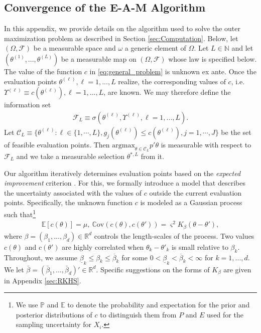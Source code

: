 \documentclass[letterpaper,11pt]{article}
\theoremstyle{myplain}
\theoremstyle{mydefinition}
\theoremstyle{myremark}
\newcommand{\E}{\mathbb{E}}
\newcommand{\F}{\mathcal{F}}
\newcommand{\bP}{\mathbb{P}}
\numberwithin{equation}{section}
\numberwithin{figure}{section}
\begin{document}
\newpage
\small
\begin{appendix}
\small
\section{Convergence of the E-A-M Algorithm}
\label{app:EAM_conv}
In this appendix, we provide details on the algorithm used to solve the outer maximization problem as described in Section \ref{sec:Computation}.
Below, let $(\Omega,\mathcal F)$ be a measurable space and $\omega$ a generic element of $\Omega$.
Let $L\in \mathbb N$ and let $(\theta^{(1)},...,\theta^{(L)})$ be a measurable map on $(\Omega,\mathcal F)$ whose law is specified below.
The value of the function $c$ in \eqref{eq:general_problem} is unknown ex ante. Once the evaluation points $\theta^{(\ell)},\ell=1,..., L$ realize, the corresponding values of $c$, i.e. $\Upsilon^{(\ell)}\equiv c(\theta^{(\ell)}),\ell=1,..., L$, are known.
We may therefore define the information set
\begin{align}
	\F_L\equiv\sigma(\theta^{(\ell)},\Upsilon^{(\ell)},\ell=1,...,L).
\end{align}
Let $\mathcal C_L\equiv\{\theta^{(\ell)}:\ell \in\{1,\cdots, L\}, g_j(\theta^{(\ell)})\le c(\theta^{(\ell)}),j=1,\cdots,J\}$
be the set of feasible evaluation points. Then $\text{argmax}_{\theta\in \mathcal C_L} p'\theta$ is measurable with respect to $\mathcal F_L$ and we take a measurable selection $\theta^{*,L}$ from it.


Our algorithm iteratively determines evaluation points based on the \emph{expected improvement} criterion \citep{jonesefficient1998}.
For this, we formally introduce a model that describes the  uncertainty associated with the values of $c$ outside the current evaluation points.
Specifically, the unknown function $c$ is modeled as a Gaussian process such that\footnote{We use $\bP$ and $\E$ to denote the probability and expectation for the prior and posterior distributions of $c$ to distinguish them from $P$ and $E$ used for the sampling uncertainty for $X_i$.}
\begin{align}
\E[c(\theta)]=\mu,~\mathbb{C}\text{ov}(c(\theta),c(\theta'))=\varsigma^2 K_{\beta}(\theta-\theta'),\label{eq:muK}
\end{align}
 where $\beta=(\beta_1,...,\beta_d)\in\mathbb R^d$ controls the length-scales of the process. Two values $c(\theta)$ and $c(\theta')$ are highly correlated when $\theta_k-\theta'_k$ is small relative to $\beta_k$.
Throughout,  we assume $\underline{\beta}_k\le \beta_k\le \overline\beta_k$ for some $0<\underline{\beta}_k<\overline{\beta}_k<\infty$ for $k=1,...,d$. We let $\bar\beta=(\bar\beta_1,...,\bar\beta_d)'\in\mathbb R^d$.  Specific suggestions on the forms of $K_\beta$ are given in Appendix \ref{sec:RKHS}.


\end{appendix}
\end{document}
